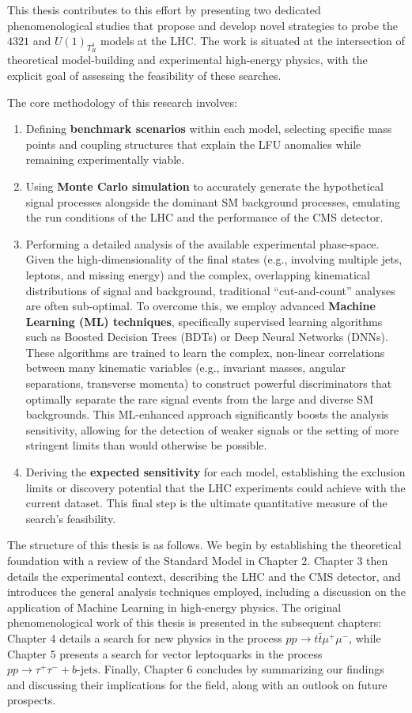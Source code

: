 This thesis contributes to this effort by presenting two dedicated phenomenological studies that propose and develop novel strategies to probe the $4321$ and $U(1)_{T^3_R}$ models at the LHC. The work is situated at the intersection of theoretical model-building and experimental high-energy physics, with the explicit goal of assessing the feasibility of these searches.

The core methodology of this research involves:
\begin{enumerate}
    \item Defining \textbf{benchmark scenarios} within each model, selecting specific mass points and coupling structures that explain the LFU anomalies while remaining experimentally viable.
    \item Using \textbf{Monte Carlo simulation} to accurately generate the hypothetical signal processes alongside the dominant SM background processes, emulating the run conditions of the LHC and the performance of the CMS detector.
    \item Performing a detailed analysis of the available experimental phase-space. Given the high-dimensionality of the final states (e.g., involving multiple jets, leptons, and missing energy) and the complex, overlapping kinematical distributions of signal and background, traditional ``cut-and-count'' analyses are often sub-optimal. To overcome this, we employ advanced \textbf{Machine Learning (ML) techniques}, specifically supervised learning algorithms such as Boosted Decision Trees (BDTs) or Deep Neural Networks (DNNs). These algorithms are trained to learn the complex, non-linear correlations between many kinematic variables (e.g., invariant masses, angular separations, transverse momenta) to construct powerful discriminators that optimally separate the rare signal events from the large and diverse SM backgrounds. This ML-enhanced approach significantly boosts the analysis sensitivity, allowing for the detection of weaker signals or the setting of more stringent limits than would otherwise be possible.
    \item Deriving the \textbf{expected sensitivity} for each model, establishing the exclusion limits or discovery potential that the LHC experiments could achieve with the current dataset. This final step is the ultimate quantitative measure of the search's feasibility.
\end{enumerate}

The structure of this thesis is as follows. We begin by establishing the theoretical foundation with a review of the Standard Model in Chapter 2. Chapter 3 then details the experimental context, describing the LHC and the CMS detector, and introduces the general analysis techniques employed, including a discussion on the application of Machine Learning in high-energy physics. The original phenomenological work of this thesis is presented in the subsequent chapters: Chapter 4 details a search for new physics in the process $pp \to t\bar{t}\mu^+\mu^-$, while Chapter 5 presents a search for vector leptoquarks in the process $pp \to \tau^+\tau^- + b\text{-jets}$. Finally, Chapter 6 concludes by summarizing our findings and discussing their implications for the field, along with an outlook on future prospects.